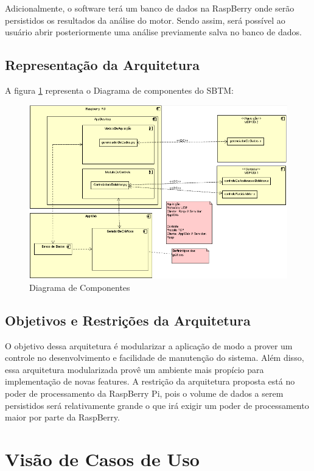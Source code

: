 \begin{anexosenv}
Adicionalmente, o software terá um banco de dados na RaspBerry onde serão persistidos os resultados da análise do motor. Sendo assim, será possível ao usuário abrir posteriormente uma análise previamente salva no banco de dados.

\subsection{Representação da Arquitetura}

A figura \ref{diagramaArquitetura} representa o Diagrama de componentes do SBTM:

\begin{figure}[h!]
	\centering
	\includegraphics[keepaspectratio=true,scale= 0.7]{figuras/DiagramaDeArquitetura.PNG}
	\caption{Diagrama de Componentes}
	\label{diagramaArquitetura}
\end{figure}

\subsection{Objetivos e Restrições da Arquitetura}

O objetivo dessa arquitetura é modularizar a aplicação de modo a prover um controle no desenvolvimento e facilidade de manutenção do sistema. Além disso, essa arquitetura modularizada provê um ambiente mais propício para implementação de novas features.
A restrição da arquitetura proposta está no poder de processamento da RaspBerry Pi, pois o volume de dados a serem persistidos será relativamente grande o que irá exigir um poder de processamento maior por parte da RaspBerry.

\section{Visão de Casos de Uso}


\end{anexosenv}
